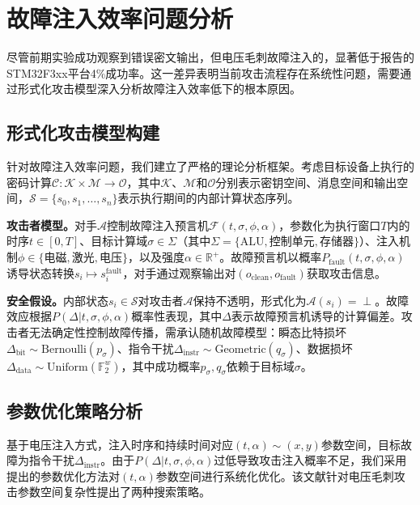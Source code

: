 \documentclass{article}
\begin{document}
\section{故障注入效率问题分析}

尽管前期实验成功观察到错误密文输出，但电压毛刺故障注入的，显著低于\cite{TCHES:BozFocPal19}报告的STM32F3xx平台4\%成功率。这一差异表明当前攻击流程存在系统性问题，需要通过形式化攻击模型深入分析故障注入效率低下的根本原因。

\subsection{形式化攻击模型构建}

针对故障注入效率问题，我们建立了严格的理论分析框架。考虑目标设备上执行的密码计算$\mathcal{C}: \mathcal{K} \times \mathcal{M} \rightarrow \mathcal{O}$，其中$\mathcal{K}$、$\mathcal{M}$和$\mathcal{O}$分别表示密钥空间、消息空间和输出空间，$\mathcal{S} = \{s_0, s_1, \ldots, s_n\}$表示执行期间的内部计算状态序列。

\textbf{攻击者模型。}对手$\mathcal{A}$控制故障注入预言机$\mathcal{F}(t, \sigma, \phi, \alpha)$，参数化为执行窗口$T$内的时序$t \in [0, T]$、目标计算域$\sigma \in \Sigma$（其中$\Sigma = \{\text{ALU}, \text{控制单元}, \text{存储器}\}$）、注入机制$\phi \in \{\text{电磁}, \text{激光}, \text{电压}\}$，以及强度$\alpha \in \mathbb{R}^+$。故障预言机以概率$P_{\text{fault}}(t, \sigma, \phi, \alpha)$诱导状态转换$s_i \mapsto s_i^{\text{fault}}$，对手通过观察输出对$(o_{\text{clean}}, o_{\text{fault}})$获取攻击信息。

\textbf{安全假设。}内部状态$s_i \in \mathcal{S}$对攻击者$\mathcal{A}$保持不透明，形式化为$\mathcal{A}(s_i) = \perp$。故障效应根据$P(\Delta | t, \sigma, \phi, \alpha)$概率性表现，其中$\Delta$表示故障预言机诱导的计算偏差。攻击者无法确定性控制故障传播，需承认随机故障模型：瞬态比特损坏$\Delta_{\text{bit}} \sim \text{Bernoulli}(p_{\sigma})$、指令干扰$\Delta_{\text{instr}} \sim \text{Geometric}(q_{\sigma})$、数据损坏$\Delta_{\text{data}} \sim \text{Uniform}(\mathbb{F}_2^w)$，其中成功概率$p_{\sigma}, q_{\sigma}$依赖于目标域$\sigma$。

\subsection{参数优化策略分析}

基于电压注入方式，注入时序和持续时间对应$(t,\alpha)\sim (x,y)$参数空间，目标故障为指令干扰$\Delta_{\text{instr}}$。由于$P(\Delta | t, \sigma, \phi, \alpha)$过低导致攻击注入概率不足，我们采用\cite{TCHES:BozFocPal19}提出的参数优化方法对$(t,\alpha)$参数空间进行系统化优化。该文献针对电压毛刺攻击参数空间复杂性提出了两种搜索策略。
\end{document}
